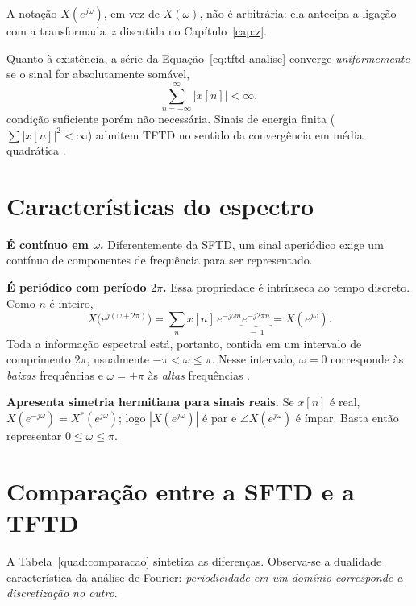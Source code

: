 \documentclass[
    12pt,
    openright,
    oneside,
    a4paper,
    chapter=TITLE,
    section=TITLE,
    brazil
]{abntex2}
\begin{document}
A notação $X(e^{j\omega})$, em vez de $X(\omega)$, não é arbitrária: ela
antecipa a ligação com a transformada~$z$ discutida no Capítulo~\ref{cap:z}.

Quanto à existência, a série da Equação~\eqref{eq:tftd-analise} converge
\emph{uniformemente} se o sinal for absolutamente somável,
\begin{equation}
    \sum_{n=-\infty}^{\infty} |x[n]| < \infty,
\end{equation}
condição suficiente porém não necessária. Sinais de energia finita
($\sum |x[n]|^2 < \infty$) admitem TFTD no sentido da convergência em média
quadrática \cite{oppenheim1999}.

\section{Características do espectro}

\begin{alineas}
\item \textbf{É contínuo em $\omega$.} Diferentemente da SFTD, um sinal aperiódico
exige um contínuo de componentes de frequência para ser representado.

\item \textbf{É periódico com período $2\pi$.} Essa propriedade é intrínseca ao tempo
discreto. Como $n$ é inteiro,
\begin{equation}
    X\big(e^{j(\omega + 2\pi)}\big) = \sum_{n} x[n]\,e^{-j\omega n}
    \underbrace{e^{-j2\pi n}}_{=\,1} = X(e^{j\omega}).
\end{equation}
Toda a informação espectral está, portanto, contida em um intervalo de comprimento
$2\pi$, usualmente $-\pi < \omega \le \pi$. Nesse intervalo, $\omega = 0$ corresponde
às \emph{baixas} frequências e $\omega = \pm\pi$ às \emph{altas} frequências
\cite{oppenheim2013}.

\item \textbf{Apresenta simetria hermitiana para sinais reais.} Se $x[n]$ é real,
$X(e^{-j\omega}) = X^{*}(e^{j\omega})$; logo $|X(e^{j\omega})|$ é par e
$\angle X(e^{j\omega})$ é ímpar. Basta então representar $0 \le \omega \le \pi$.
\end{alineas}

\section{Comparação entre a SFTD e a TFTD}

A Tabela~\ref{quad:comparacao} sintetiza as diferenças. Observa-se a dualidade
característica da análise de Fourier: \emph{periodicidade em um domínio corresponde a
discretização no outro}.
\end{document}
